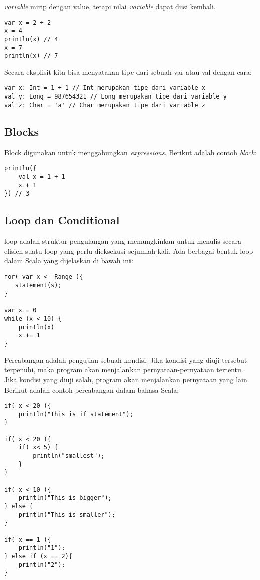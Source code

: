 \textit{variable} mirip dengan value, tetapi nilai \textit{variable} dapat diisi kembali.

\begin{verbatim}
var x = 2 + 2 
x = 4 
println(x) // 4 
x = 7 
println(x) // 7 
\end{verbatim}

Secara eksplisit kita bisa menyatakan tipe dari sebuah var atau val dengan cara:

\begin{verbatim}
var x: Int = 1 + 1 // Int merupakan tipe dari variable x
val y: Long = 987654321 // Long merupakan tipe dari variable y
val z: Char = 'a' // Char merupakan tipe dari variable z
\end{verbatim}

\subsection{Blocks}

Block digunakan untuk menggabungkan \textit{expressions}. Berikut adalah contoh \textit{block}:

\begin{verbatim}
println({
    val x = 1 + 1
    x + 1
}) // 3 
\end{verbatim}

\subsection{Loop dan Conditional}

loop adalah struktur pengulangan yang memungkinkan untuk menulis secara efisien suatu loop yang perlu dieksekusi sejumlah kali. Ada berbagai bentuk loop dalam Scala yang dijelaskan di bawah ini: 

\begin{verbatim}
for( var x <- Range ){
   statement(s);
}

var x = 0
while (x < 10) {
    println(x)
    x += 1
}
\end{verbatim}

Percabangan adalah pengujian sebuah kondisi. Jika kondisi yang diuji tersebut terpenuhi, maka program akan menjalankan pernyataan-pernyataan tertentu. Jika kondisi yang diuji salah, program akan menjalankan pernyataan yang lain. Berikut adalah contoh percabangan dalam bahasa Scala:

\begin{verbatim}
if( x < 20 ){
    println("This is if statement");
}

if( x < 20 ){
    if( x< 5) {
        println("smallest");
    }
}

if( x < 10 ){
    println("This is bigger");
} else { 
    println("This is smaller");
}

if( x == 1 ){
    println("1");
} else if (x == 2){ 
    println("2");
}
\end{verbatim}


